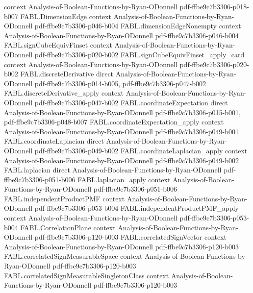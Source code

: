 \begin{theorem}
  {context}
  {Analysis-of-Boolean-Functions-by-Ryan-ODonnell}
  {pdf-ffbe9c7b3306-p018-b007}
\proofstep
  {FABL.DimensionEdge}
  {context}
  {Analysis-of-Boolean-Functions-by-Ryan-ODonnell}
  {pdf-ffbe9c7b3306-p046-b004}
\proofstep
  {FABL.dimensionEdgeNonempty}
  {context}
  {Analysis-of-Boolean-Functions-by-Ryan-ODonnell}
  {pdf-ffbe9c7b3306-p046-b004}
\proofstep
  {FABL.signCubeEquivFinset}
  {context}
  {Analysis-of-Boolean-Functions-by-Ryan-ODonnell}
  {pdf-ffbe9c7b3306-p020-b002}
\proofstep
  {FABL.signCubeEquivFinset_apply_card}
  {context}
  {Analysis-of-Boolean-Functions-by-Ryan-ODonnell}
  {pdf-ffbe9c7b3306-p020-b002}
\proofstep
  {FABL.discreteDerivative}
  {direct}
  {Analysis-of-Boolean-Functions-by-Ryan-ODonnell}
  {pdf-ffbe9c7b3306-p014-b005,
    pdf-ffbe9c7b3306-p047-b002}
\proofstep
  {FABL.discreteDerivative_apply}
  {context}
  {Analysis-of-Boolean-Functions-by-Ryan-ODonnell}
  {pdf-ffbe9c7b3306-p047-b002}
\proofstep
  {FABL.coordinateExpectation}
  {direct}
  {Analysis-of-Boolean-Functions-by-Ryan-ODonnell}
  {pdf-ffbe9c7b3306-p015-b001,
    pdf-ffbe9c7b3306-p048-b007}
\proofstep
  {FABL.coordinateExpectation_apply}
  {context}
  {Analysis-of-Boolean-Functions-by-Ryan-ODonnell}
  {pdf-ffbe9c7b3306-p049-b001}
\proofstep
  {FABL.coordinateLaplacian}
  {direct}
  {Analysis-of-Boolean-Functions-by-Ryan-ODonnell}
  {pdf-ffbe9c7b3306-p049-b002}
\proofstep
  {FABL.coordinateLaplacian_apply}
  {context}
  {Analysis-of-Boolean-Functions-by-Ryan-ODonnell}
  {pdf-ffbe9c7b3306-p049-b002}
\proofstep
  {FABL.laplacian}
  {direct}
  {Analysis-of-Boolean-Functions-by-Ryan-ODonnell}
  {pdf-ffbe9c7b3306-p051-b006}
\proofstep
  {FABL.laplacian_apply}
  {context}
  {Analysis-of-Boolean-Functions-by-Ryan-ODonnell}
  {pdf-ffbe9c7b3306-p051-b006}
\proofstep
  {FABL.independentProductPMF}
  {context}
  {Analysis-of-Boolean-Functions-by-Ryan-ODonnell}
  {pdf-ffbe9c7b3306-p053-b004}
\proofstep
  {FABL.independentProductPMF_apply}
  {context}
  {Analysis-of-Boolean-Functions-by-Ryan-ODonnell}
  {pdf-ffbe9c7b3306-p053-b004}
\proofstep
  {FABL.CorrelationPlane}
  {context}
  {Analysis-of-Boolean-Functions-by-Ryan-ODonnell}
  {pdf-ffbe9c7b3306-p120-b003}
\proofstep
  {FABL.correlatedSignVector}
  {context}
  {Analysis-of-Boolean-Functions-by-Ryan-ODonnell}
  {pdf-ffbe9c7b3306-p120-b003}
\proofstep
  {FABL.correlatedSignMeasurableSpace}
  {context}
  {Analysis-of-Boolean-Functions-by-Ryan-ODonnell}
  {pdf-ffbe9c7b3306-p120-b003}
\proofstep
  {FABL.correlatedSignMeasurableSingletonClass}
  {context}
  {Analysis-of-Boolean-Functions-by-Ryan-ODonnell}
  {pdf-ffbe9c7b3306-p120-b003}

\end{theorem}
